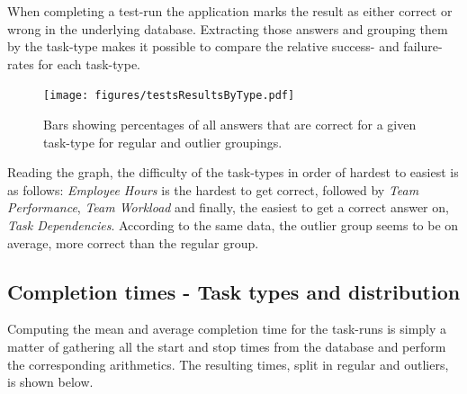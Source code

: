 \documentclass[nofilelist,dvipsnames]{cslthse-msc}
\begin{document}
        When completing a test-run the application marks the result as
        either correct or wrong in the underlying database. Extracting
        those answers and grouping them by the task-type makes it possible to
        compare the relative success- and failure-rates for each task-type.

				\begin{figure}[h!]
					\centering
          \texttt{[image: figures/testsResultsByType.pdf]}
          \caption{
            Bars showing percentages of all answers that are correct for a
            given task-type for regular and outlier groupings.
          }
				\end{figure}

        Reading the graph, the difficulty of the task-types in order of hardest
        to easiest is as follows: \textit{Employee Hours} is the hardest to get
        correct, followed by \textit{Team Performance}, \textit{Team Workload}
        and finally, the easiest to get a correct answer on, \textit{Task
          Dependencies}. According to the same data, the outlier group seems to
        be on average, more correct than the regular group.



%
      \subsection{Completion times - Task types and distribution}

        Computing the mean and average completion time for the task-runs is
        simply a matter of gathering all the start and stop times from the
        database and perform the corresponding arithmetics. The resulting times,
        split in regular and outliers, is shown below.
\end{document}
